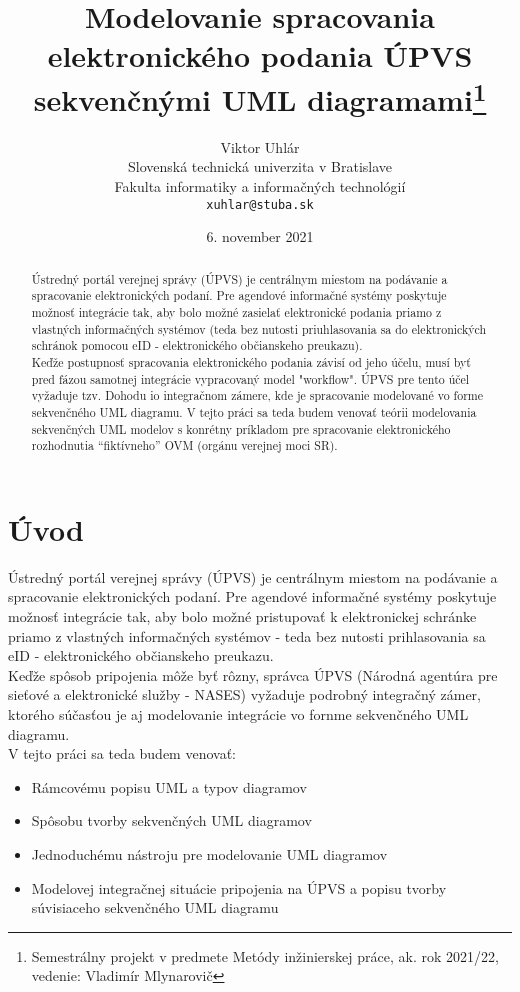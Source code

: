 \documentclass[10pt,twoside,slovak,a4paper]{article}
\title{{\bf Modelovanie spracovania elektronického podania ÚPVS sekvenčnými UML diagramami}\thanks{Semestrálny projekt v predmete Metódy inžinierskej práce, ak. rok 2021/22, vedenie: Vladimír Mlynarovič}} %
\author{Viktor Uhlár\\[2pt]
	{\small Slovenská technická univerzita v Bratislave}\\
	{\small Fakulta informatiky a informačných technológií}\\
	{\small \texttt{xuhlar@stuba.sk}}
	}
\date{\small 6. november 2021}
\begin{document}
\begin {titlepage}
\centering
\maketitle

\begin{abstract}


{Ústredný portál verejnej správy (ÚPVS) je centrálnym miestom na podávanie a spracovanie elektronických podaní. Pre agendové informačné systémy poskytuje možnosť integrácie tak, aby bolo možné zasielať elektronické podania priamo z vlastných informačných systémov (teda bez nutosti priuhlasovania sa do elektronických schránok pomocou eID - elektronického občianskeho preukazu).}\\

{Keďže postupnosť spracovania elektronického podania závisí od jeho účelu, musí byť pred fázou samotnej integrácie vypracovaný model "workflow". ÚPVS pre tento účel vyžaduje tzv. Dohodu io integračnom zámere, kde je spracovanie modelované vo forme sekvenčného UML diagramu.
V tejto práci sa teda budem venovať teórii modelovania sekvenčných UML modelov s konrétny príkladom pre spracovanie elektronického rozhodnutia ``fiktívneho''  OVM (orgánu verejnej moci SR).}

\end{abstract}

\end{titlepage}
\flushleft
\section{Úvod}

Ústredný portál verejnej správy (ÚPVS) je centrálnym miestom na podávanie a spracovanie elektronických podaní. Pre agendové informačné systémy poskytuje možnosť integrácie tak, aby bolo možné pristupovať k elektronickej schránke priamo z vlastných informačných systémov - teda bez nutosti prihlasovania sa eID - elektronického občianskeho preukazu.\\

Keďže spôsob pripojenia môže byť rôzny, správca ÚPVS (Národná agentúra pre sieťové a elektronické služby - NASES) vyžaduje podrobný integračný zámer, ktorého súčasťou je aj modelovanie integrácie vo fornme sekvenčného UML diagramu.\\ 

V tejto práci sa teda budem venovať:

\begin{itemize}
\item Rámcovému popisu UML a typov diagramov
\item Spôsobu tvorby sekvenčných UML diagramov
\item Jednoduchému nástroju pre modelovanie UML diagramov
\item Modelovej integračnej situácie pripojenia na ÚPVS a popisu tvorby súvisiaceho sekvenčného UML diagramu
\end{itemize}
\end{document}

